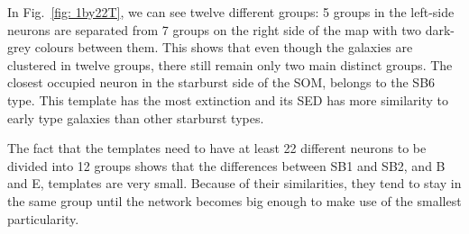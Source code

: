             In Fig.~\ref{fig: 1by22T}, we can see twelve different groups:
            5 groups in the left-side neurons are separated from 7 groups on the right side of the map with two dark-grey colours between them.
            This shows that even though the galaxies are clustered in twelve groups, there still remain only two main distinct groups.
            The closest occupied neuron in the starburst side of the SOM, belongs to the SB6 type. 
            This template has the most extinction and its SED has more similarity to early type galaxies than other starburst types. 
            
            The fact that the templates need to have at least 22 different neurons to be divided into 12 groups shows that the differences between SB1 and SB2, and B and E, templates are very small.
            Because of their similarities, they tend to stay in the same group until the network becomes big enough to make use of the smallest particularity.
           
